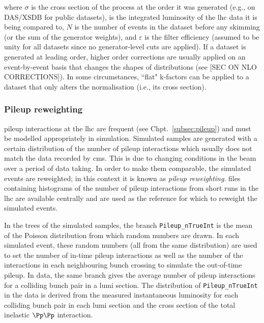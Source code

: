 where $\sigma$ is the cross section of the process at the order it was generated (e.g., on DAS/XSDB for public datasets), \intlumi is the integrated luminosity of the \acrshort{lhc} data it is being compared to, $N$ is the number of events in the dataset before any skimming (or the sum of the generator weights), and $\varepsilon$ is the filter efficiency (assumed to be unity for all datasets since no generator-level cuts are applied). If a dataset is generated at leading order, higher order corrections are usually applied on an event-by-event basis that changes the shapes of distributions (see [SEC ON NLO CORRECTIONS]). In some circumstances, ``flat" k-factors can be applied to a dataset that only alters the normalisation (i.e., its cross section).




\subsubsection{Pileup reweighting}
\label{subsubsec:pu_reweighting}

\Gls{pileup} interactions at the \acrshort{lhc} are frequent (see Chpt.~\ref{subsec:pileup}) and must be modelled appropriately in simulation. Simulated samples are generated with a certain distribution of the number of \gls{pileup} interactions which usually does not match the data recorded by \acrshort{cms}. This is due to changing conditions in the beam over a period of data taking. In order to make them comparable, the simulated events are reweighted; in this context it is known as \emph{\gls{pileup} reweighting}. \ROOT files containing histograms of the number of \gls{pileup} interactions from short runs in the \acrshort{lhc} are available centrally and are used as the reference for which to reweight the simulated events.

In the trees of the simulated samples, the branch \texttt{Pileup\_nTrueInt} is the mean of the Poisson distribution from which random numbers are drawn. In each simulated event, these random numbers (all from the same distribution) are used to set the number of in-time \gls{pileup} interactions as well as the number of the interactions in each neighbouring bunch crossing to simulate the out-of-time \gls{pileup}. In data, the same branch gives the average number of \gls{pileup} interactions for a colliding bunch pair in a lumi section. The distribution of \texttt{Pileup\_nTrueInt} in the data is derived from the measured instantaneous luminosity for each colliding bunch pair in each lumi section and the cross section of the total inelastic $\Pp\Pp$ interaction.

